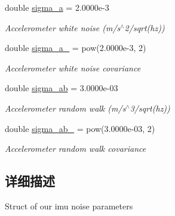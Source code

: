 \begin{DoxyCompactItemize}
double \hyperlink{structov__msckf_1_1NoiseManager_a6dee9928908bd58d9628176d9088b3b9}{sigma\+\_\+a} = 2.\+0000e-\/3
\begin{DoxyCompactList}\small\item\em Accelerometer white noise (m/s$^\wedge$2/sqrt(hz)) \end{DoxyCompactList}\item 
\mbox{\label{structov__msckf_1_1NoiseManager_ad1997253aae2e7df977d9b752255bda6}} 
double \hyperlink{structov__msckf_1_1NoiseManager_ad1997253aae2e7df977d9b752255bda6}{sigma\+\_\+a\+\_} = pow(2.\+0000e-\/3, 2)
\begin{DoxyCompactList}\small\item\em Accelerometer white noise covariance \end{DoxyCompactList}\item 
\mbox{\label{structov__msckf_1_1NoiseManager_a31ddf8bc77fedc830ed28a8eac9a49c7}} 
double \hyperlink{structov__msckf_1_1NoiseManager_a31ddf8bc77fedc830ed28a8eac9a49c7}{sigma\+\_\+ab} = 3.\+0000e-\/03
\begin{DoxyCompactList}\small\item\em Accelerometer random walk (m/s$^\wedge$3/sqrt(hz)) \end{DoxyCompactList}\item 
\mbox{\label{structov__msckf_1_1NoiseManager_a568ec4370e05451c73c8d7de250c12e2}} 
double \hyperlink{structov__msckf_1_1NoiseManager_a568ec4370e05451c73c8d7de250c12e2}{sigma\+\_\+ab\+\_} = pow(3.\+0000e-\/03, 2)
\begin{DoxyCompactList}\small\item\em Accelerometer random walk covariance \end{DoxyCompactList}\end{DoxyCompactItemize}


\subsection{详细描述}
Struct of our imu noise parameters 